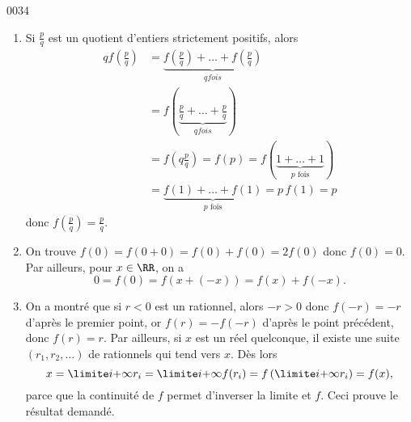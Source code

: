 
\begin{corrige}{0034}

\begin{enumerate}
\item Si $\frac p q$ est un quotient d'entiers strictement positifs,
  alors
  \begin{align*}
    q f(\frac pq) &= \underbrace{f(\frac pq) + \ldots + f(\frac pq)}_{\text{$q fois$}}\\
    &= f(\underbrace{\frac pq + \ldots
      + \frac pq}_{\text{$q fois$}})\\
    &= f(q \frac pq) = f(p) = f(\underbrace{1 +
      \ldots + 1}_{\text{$p$ fois}})\\
    &= \underbrace{f(1)+\ldots+f(1)}_{\text{$p$ fois}} = p \, f(1) = p
  \end{align*}
  donc $f(\frac pq) = \frac pq$.

\item On trouve $f(0) = f(0+0) = f(0)+f(0) = 2 f(0)$ donc
  $f(0)=0$. Par ailleurs, pour $x \in \RR$, on a
  \begin{equation*}
    0 = f(0) = f(x+(-x)) = f(x) + f(-x).
  \end{equation*}

\item On a montré que si $r < 0$ est un rationnel, alors $-r > 0$ donc $f(-r) = -r$ d'après le premier point, or $f(r) = -f(-r)$ d'après le point précédent, donc $f(r) = r$. Par ailleurs, si $x$ est un réel quelconque, il existe une suite $(r_1, r_2, \ldots)$ de rationnels qui tend vers $x$. Dès lors
  \begin{equation*}
    x = \limite i {+\infty} r_i =  \limite i {+\infty} f(r_i) = f\left(\limite i {+\infty} r_i\right) = f(x),
  \end{equation*}
parce que la continuité de $f$ permet d'inverser la limite et $f$. Ceci prouve le résultat demandé.
\end{enumerate}

\end{corrige}
